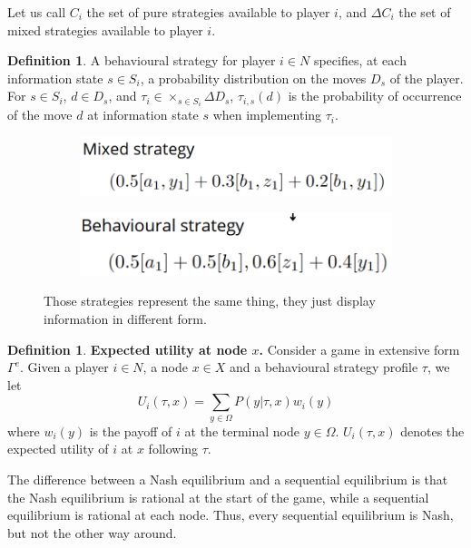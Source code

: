 \documentclass[12pt, openany]{report}
\theoremstyle{definition}
\newtheorem{definition}[thm]{Definition}
\begin{document}
Let us call $C_i$ the set of pure strategies available to player $i$, and $\Delta C_i$ the set of mixed strategies available to player $i$. 
\begin{definition}
	A behavioural strategy for player $i\in N$ specifies, at each information state $s\in S_i$, a probability distribution on the moves $D_s$ of the player. For $s\in S_i$, $d\in D_s$, and $\tau_i\in \times_{s\in S_i} \Delta D_s$, $\tau_{i,s}(d)$ is the probability of occurrence of the move $d$ at information state $s$ when implementing $\tau_i$. 
\end{definition}
\begin{figure}[H]
	\begin{subfigure}[b]{.49\textwidth}
		\centering
		\includegraphics[width=\textwidth]{img/mixed.png}
	\end{subfigure}
	\begin{subfigure}[b]{.5\textwidth}
		\centering
		\includegraphics[width=\textwidth]{img/behavioural.png}
	\end{subfigure}
	\caption{Those strategies represent the same thing, they just display information in different form.}
\end{figure}
\begin{definition}\textbf{Expected utility at node $x$.}
	Consider a game in extensive form $\Gamma^e$. Given a player $i\in N$, a node $x\in X$ and a behavioural strategy profile $\tau$, we let 
	\begin{equation}
		U_i(\tau,x) = \sum_{y\in \Omega} P(y|\tau,x)w_i(y)
	\end{equation}
	where $w_i(y)$ is the payoff of $i$ at the terminal node $y\in \Omega$. $U_i(\tau,x)$ denotes the expected utility of $i$ at $x$ following $\tau$. 
\end{definition}
The difference between a Nash equilibrium and a sequential equilibrium is that the Nash equilibrium is rational at the start of the game, while a sequential equilibrium is rational at each node. Thus, every sequential equilibrium is Nash, but not the other way around. 
\end{document}
